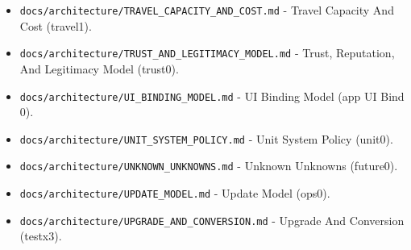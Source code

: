 \documentclass[9pt,a4paper,openany]{book}
\begin{document}
\begin{itemize}
\item \texttt{docs/\allowbreak{}architecture/\allowbreak{}TRAVEL\_\allowbreak{}CAPACITY\_\allowbreak{}AND\_\allowbreak{}COST.\allowbreak{}md} -\allowbreak{} Travel Capacity And Cost (travel1).\allowbreak{}
\end{itemize}

\begin{itemize}
\item \texttt{docs/\allowbreak{}architecture/\allowbreak{}TRUST\_\allowbreak{}AND\_\allowbreak{}LEGITIMACY\_\allowbreak{}MODEL.\allowbreak{}md} -\allowbreak{} Trust, Reputation, And Legitimacy Model (trust0).\allowbreak{}
\end{itemize}

\begin{itemize}
\item \texttt{docs/\allowbreak{}architecture/\allowbreak{}UI\_\allowbreak{}BINDING\_\allowbreak{}MODEL.\allowbreak{}md} -\allowbreak{} UI Binding Model (app UI Bind 0).\allowbreak{}
\end{itemize}

\begin{itemize}
\item \texttt{docs/\allowbreak{}architecture/\allowbreak{}UNIT\_\allowbreak{}SYSTEM\_\allowbreak{}POLICY.\allowbreak{}md} -\allowbreak{} Unit System Policy (unit0).\allowbreak{}
\end{itemize}

\begin{itemize}
\item \texttt{docs/\allowbreak{}architecture/\allowbreak{}UNKNOWN\_\allowbreak{}UNKNOWNS.\allowbreak{}md} -\allowbreak{} Unknown Unknowns (future0).\allowbreak{}
\end{itemize}

\begin{itemize}
\item \texttt{docs/\allowbreak{}architecture/\allowbreak{}UPDATE\_\allowbreak{}MODEL.\allowbreak{}md} -\allowbreak{} Update Model (ops0).\allowbreak{}
\end{itemize}

\begin{itemize}
\item \texttt{docs/\allowbreak{}architecture/\allowbreak{}UPGRADE\_\allowbreak{}AND\_\allowbreak{}CONVERSION.\allowbreak{}md} -\allowbreak{} Upgrade And Conversion (testx3).\allowbreak{}
\end{itemize}
\end{document}
